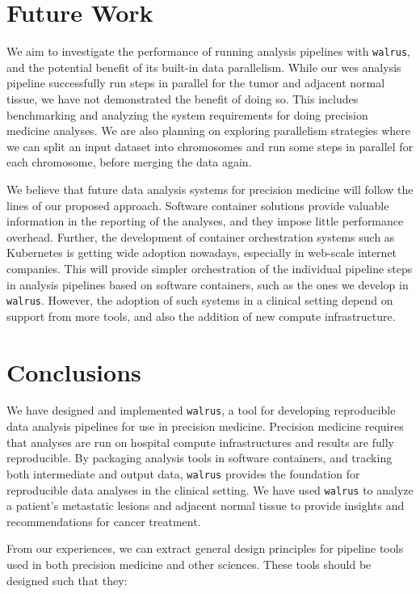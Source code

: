 \section{Future Work}
We aim to investigate the performance of running analysis pipelines with
\texttt{walrus}, and the potential benefit of its built-in data parallelism.
While our \gls{wes} analysis pipeline successfully run steps in parallel for the
tumor and adjacent normal tissue, we have not demonstrated the benefit
of doing so. This includes benchmarking and analyzing the system requirements
for doing precision medicine analyses.  We are also planning on exploring
parallelism strategies where we can split an input dataset into chromosomes and
run some steps in parallel for each chromosome, before merging the data again. 

We believe that future data analysis systems for precision medicine will follow
the lines of our proposed approach. Software container solutions provide
valuable information in the reporting of the analyses, and they impose little
performance overhead. Further, the development of container orchestration
systems such as Kubernetes is getting wide adoption nowadays, especially in
web-scale internet companies. This will provide simpler orchestration of the
individual pipeline steps in analysis pipelines based on software containers,
such as the ones we develop in \texttt{walrus}. However, the adoption of such
systems in a clinical setting depend on support from more tools, and also the
addition of new compute infrastructure. 


\section{Conclusions} 
We have designed and implemented \texttt{walrus}, a tool for developing 
reproducible data analysis pipelines for use in precision medicine. Precision
medicine requires that analyses are run on hospital compute infrastructures and
results are fully reproducible. By packaging analysis tools in software
containers, and tracking both intermediate and output data, \texttt{walrus}
provides the foundation for reproducible data analyses in the clinical setting.
We have used \texttt{walrus} to analyze a patient's metastatic lesions and
adjacent normal tissue to provide insights and recommendations for  cancer
treatment. 

From our experiences, we can extract general design principles for pipeline
tools used in both precision medicine and other sciences. These tools should be
designed such that they: 

